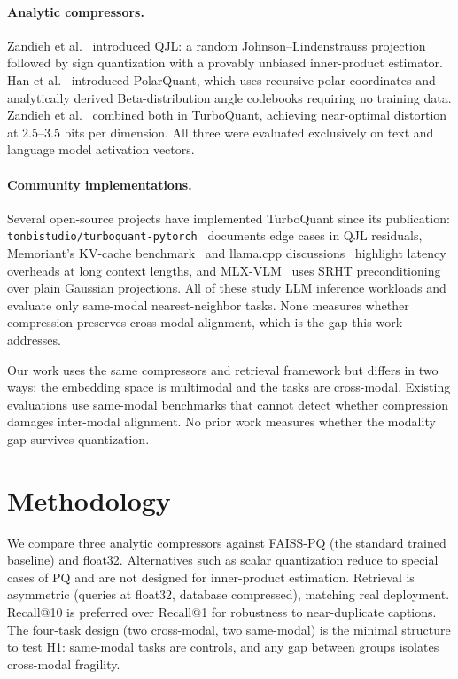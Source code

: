 \documentclass[11pt]{article}
\begin{document}
\paragraph{Analytic compressors.}
Zandieh et al.~\cite{zandieh2024qjl} introduced QJL: a random Johnson--Lindenstrauss projection followed
by sign quantization with a provably unbiased inner-product estimator. Han et al.~\cite{han2026polarquant}
introduced PolarQuant, which uses recursive polar coordinates and analytically derived Beta-distribution
angle codebooks requiring no training data. Zandieh et al.~\cite{zandieh2026turboquant} combined both
in TurboQuant, achieving near-optimal distortion at 2.5--3.5 bits per dimension. All three were evaluated
exclusively on text and language model activation vectors.

\paragraph{Community implementations.}
Several open-source projects have implemented TurboQuant since its publication: \texttt{tonbistudio/turboquant-pytorch}~\cite{tonbistudio2026} documents edge cases in QJL residuals, Memoriant's KV-cache benchmark~\cite{memoriant2026} and llama.cpp discussions~\cite{ggmlorg2026} highlight latency overheads at long context lengths, and MLX-VLM~\cite{mlxvlm2026} uses SRHT preconditioning over plain Gaussian projections.
All of these study LLM inference workloads and evaluate only same-modal nearest-neighbor tasks.
None measures whether compression preserves cross-modal alignment, which is the gap this work addresses.

Our work uses the same compressors and retrieval framework but differs in two ways: the embedding space
is multimodal and the tasks are cross-modal. Existing evaluations use same-modal benchmarks that cannot
detect whether compression damages inter-modal alignment. No prior work measures whether the modality
gap survives quantization.

\section{Methodology}

We compare three analytic compressors against FAISS-PQ (the standard trained baseline) and float32.
Alternatives such as scalar quantization reduce to special cases of PQ and are not designed for
inner-product estimation. Retrieval is asymmetric (queries at float32, database compressed), matching
real deployment. Recall@10 is preferred over Recall@1 for robustness to near-duplicate captions.
The four-task design (two cross-modal, two same-modal) is the minimal structure to test H1: same-modal
tasks are controls, and any gap between groups isolates cross-modal fragility.
\end{document}
